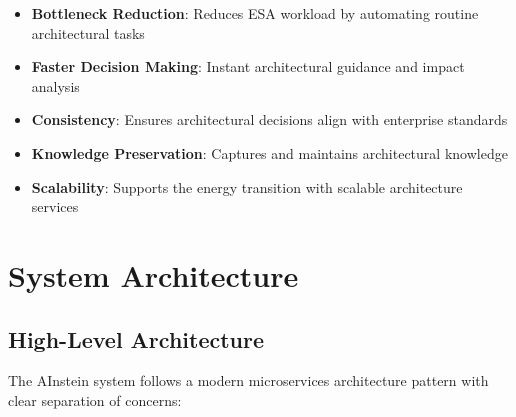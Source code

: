 \documentclass[12pt,a4paper]{report}
\begin{document}
\begin{itemize}
    \item \textbf{Bottleneck Reduction}: Reduces ESA workload by automating routine architectural tasks
    \item \textbf{Faster Decision Making}: Instant architectural guidance and impact analysis
    \item \textbf{Consistency}: Ensures architectural decisions align with enterprise standards
    \item \textbf{Knowledge Preservation}: Captures and maintains architectural knowledge
    \item \textbf{Scalability}: Supports the energy transition with scalable architecture services
\end{itemize}

\chapter{System Architecture}

\section{High-Level Architecture}

The AInstein system follows a modern microservices architecture pattern with clear separation of concerns:
\end{document}
